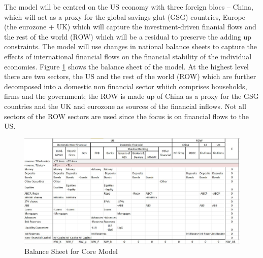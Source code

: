 \documentclass[twoside,a4paper,11pt]{article}
\begin{document}
The model will be centred on the US economy with  three foreign blocs -- China, which will act as a proxy for the global savings glut (GSG) countries, Europe (the eurozone + UK) which will capture the investment-driven finanial flows and the rest of the world (ROW) which will be a residual to preserve the adding up constraints. The model will use changes in national balance sheets to capture the effects of international financial flows on the financial stability of the individual economies. Figure \ref{fig:bs} shows the balance sheet of the model. At the highest level there are two sectors, the US and the rest of the world (ROW) which are further decomposed into a domestic non financial sector whiich comprises households, firms and the government; the ROW is made up of China as a proxy for the GSG countries and the UK and eurozone as sources of the financial inflows. Not all sectors of the ROW sectors are used since the focus is on financial flows to the US. 

\begin{figure}
  \includegraphics[width=\linewidth]{balance-sheet.jpg}
  \caption{Balance Sheet for Core Model}
  \label{fig:bs}
\end{figure}
\end{document}
